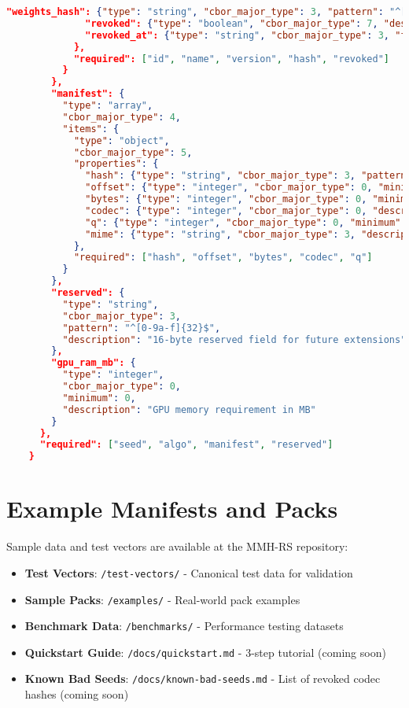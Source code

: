\documentclass[11pt,a4paper]{article}
\begin{document}
\begin{lstlisting}[language=json, breaklines=true, basicstyle=\ttfamily\footnotesize, columns=fullflexible, keepspaces=true]
	          "weights_hash": {"type": "string", "cbor_major_type": 3, "pattern": "^[0-9a-f]{64}$", "description": "Neural weights hash"},
	          "revoked": {"type": "boolean", "cbor_major_type": 7, "description": "Codec revocation status"},
	          "revoked_at": {"type": "string", "cbor_major_type": 3, "format": "date-time", "description": "Revocation timestamp"}
	        },
	        "required": ["id", "name", "version", "hash", "revoked"]
	      }
	    },
	    "manifest": {
	      "type": "array",
	      "cbor_major_type": 4,
	      "items": {
	        "type": "object",
	        "cbor_major_type": 5,
	        "properties": {
	          "hash": {"type": "string", "cbor_major_type": 3, "pattern": "^[0-9a-f]{64}$", "description": "Chunk content hash"},
	          "offset": {"type": "integer", "cbor_major_type": 0, "minimum": 0, "description": "Chunk offset for random seek"},
	          "bytes": {"type": "integer", "cbor_major_type": 0, "minimum": 1, "description": "Chunk size in bytes"},
	          "codec": {"type": "integer", "cbor_major_type": 0, "description": "Codec identifier from codec_table"},
	          "q": {"type": "integer", "cbor_major_type": 0, "minimum": 0, "maximum": 255, "description": "Quality parameter"},
	          "mime": {"type": "string", "cbor_major_type": 3, "description": "MIME type for file preview"}
	        },
	        "required": ["hash", "offset", "bytes", "codec", "q"]
	      }
	    },
	    "reserved": {
	      "type": "string",
	      "cbor_major_type": 3,
	      "pattern": "^[0-9a-f]{32}$",
	      "description": "16-byte reserved field for future extensions"
	    },
	    "gpu_ram_mb": {
	      "type": "integer",
	      "cbor_major_type": 0,
	      "minimum": 0,
	      "description": "GPU memory requirement in MB"
	    }
	  },
	  "required": ["seed", "algo", "manifest", "reserved"]
	}
	\end{lstlisting}
	
	\section{Example Manifests and Packs}
	
	Sample data and test vectors are available at the MMH-RS repository:
	
	\begin{itemize}
		\item \textbf{Test Vectors}: \texttt{/test-vectors/} - Canonical test data for validation
		\item \textbf{Sample Packs}: \texttt{/examples/} - Real-world pack examples
		\item \textbf{Benchmark Data}: \texttt{/benchmarks/} - Performance testing datasets
		\item \textbf{Quickstart Guide}: \texttt{/docs/quickstart.md} - 3-step tutorial (coming soon)
		\item \textbf{Known Bad Seeds}: \texttt{/docs/known-bad-seeds.md} - List of revoked codec hashes (coming soon)
	\end{itemize}
	
\end{document}
